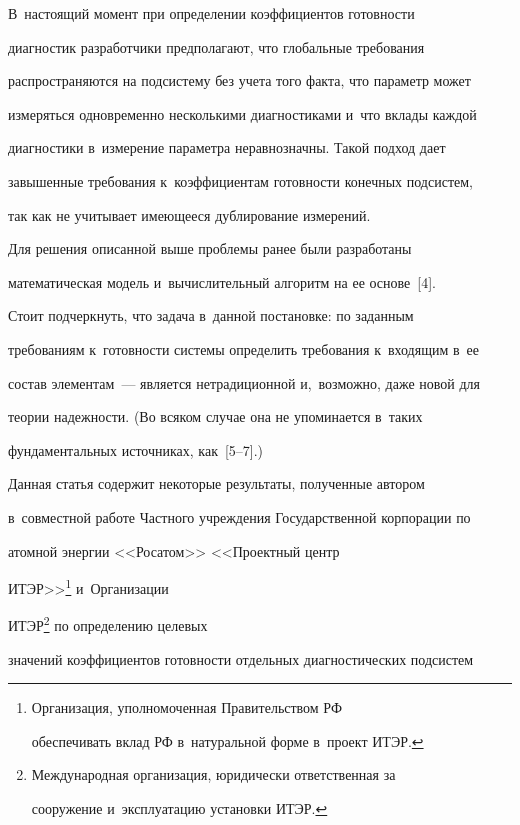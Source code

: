 В~настоящий момент при определении коэффициентов готовности 


диагностик разработчики предполагают, что глобальные требования 


распространяются на под\-сис\-те\-му без учета того факта, что параметр может 


измеряться одновременно несколькими диагностиками и~что вклады каждой 


диагностики в~измерение па\-ра\-мет\-ра неравнозначны. Такой подход дает 


завышенные требования к~коэффициентам го\-тов\-ности конечных под\-сис\-тем, 


так как не учитывает имеющееся дублирование измерений.





Для решения описанной выше проблемы ранее были разработаны 


математическая модель и~вычислительный алгоритм на ее основе~[4].





Стоит подчеркнуть, что задача в~данной постановке: по заданным 


требованиям к~готовности сис\-те\-мы определить требования к~входящим в~ее 


состав элементам~--- является нетрадиционной и,~возможно, даже новой для 


теории на\-деж\-ности. (Во всяком случае она не упоминается в~таких 


фундаментальных источниках, как~[5--7].) 





Данная статья содержит некоторые результаты, полученные автором 


в~совместной работе Част\-но\-го учреж\-де\-ния Государственной корпорации по 


атомной энергии <<Росатом>> <<Проектный центр 


ИТЭР>>\footnote{Организация, уполномоченная Правительством РФ 


обеспечивать вклад РФ в~натуральной форме в~проект ИТЭР.} и~Организации 


ИТЭР\footnote{Международная организация, юридически ответственная за 


сооружение и~эксплуатацию установки ИТЭР.} по определению целевых 


значений коэффициентов готовности отдельных диагностических подсистем 



